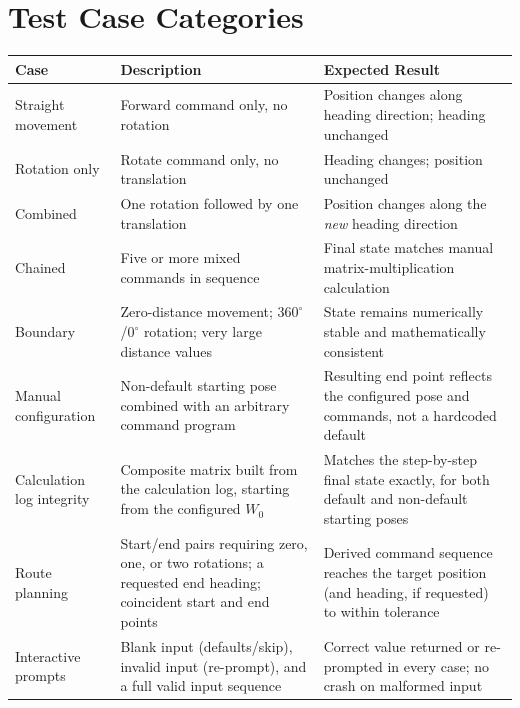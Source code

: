 \documentclass[12pt]{report}
\begin{document}
\section{Test Case Categories}
\enlargethispage{2\baselineskip}
\begin{center}
\begin{tabular}{>{\raggedright\arraybackslash}p{2.6cm}>{\raggedright\arraybackslash}p{4.6cm}>{\raggedright\arraybackslash}p{4.4cm}}
\toprule
\rowcolor{HULight}
\textbf{\color{HUPurple}Case} & \textbf{\color{HUPurple}Description} & \textbf{\color{HUPurple}Expected Result} \\
\midrule
Straight movement & Forward command only, no rotation & Position changes along heading direction; heading unchanged \\
\addlinespace
Rotation only & Rotate command only, no translation & Heading changes; position unchanged \\
\addlinespace
Combined & One rotation followed by one translation & Position changes along the \emph{new} heading direction \\
\addlinespace
Chained & Five or more mixed commands in sequence & Final state matches manual matrix-multiplication calculation \\
\addlinespace
Boundary & Zero-distance movement; $360^\circ$/$0^\circ$ rotation; very large distance values & State remains numerically stable and mathematically consistent \\
\addlinespace
Manual configuration & Non-default starting pose combined with an arbitrary command program & Resulting end point reflects the configured pose and commands, not a hardcoded default \\
\addlinespace
Calculation log integrity & Composite matrix built from the calculation log, starting from the configured $W_0$ & Matches the step-by-step final state exactly, for both default and non-default starting poses \\
\addlinespace
Route planning & Start/end pairs requiring zero, one, or two rotations; a requested end heading; coincident start and end points & Derived command sequence reaches the target position (and heading, if requested) to within tolerance \\
\addlinespace
Interactive prompts & Blank input (defaults/skip), invalid input (re-prompt), and a full valid input sequence & Correct value returned or re-prompted in every case; no crash on malformed input \\
\bottomrule
\end{tabular}
\end{center}
\end{document}
